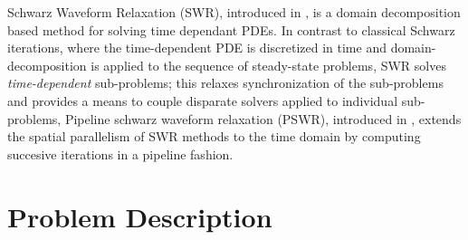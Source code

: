 \documentclass{svmult-ddm}
\begin{document}
Schwarz Waveform Relaxation (SWR), introduced in \cite{bjorhus1995},
is a domain decomposition based method for solving time dependant
PDEs.
In contrast to classical Schwarz iterations, where
the time-dependent PDE is discretized in time and domain-decomposition
is applied to the sequence of steady-state problems, SWR solves {\em
  time-dependent} sub-problems; this relaxes synchronization of the
sub-problems and provides a means to couple disparate solvers applied
to individual sub-problems,
Pipeline schwarz waveform relaxation (PSWR), introduced in \cite{ongpipeline},
extends the spatial parallelism of SWR methods to the time domain by
computing succesive iterations in a pipeline fashion.

\section{Problem Description}
\label{prop_sec:waveform}
\end{document}

